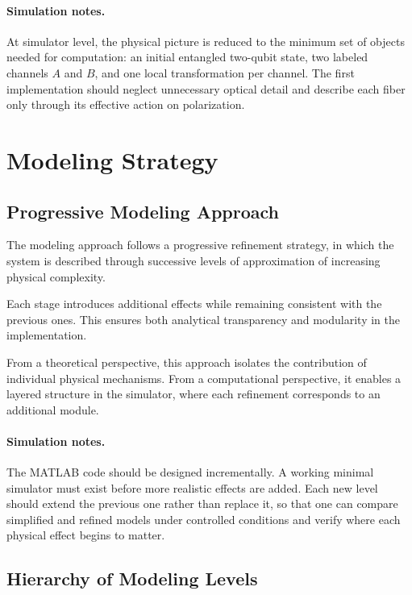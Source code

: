 \documentclass[a4paper]{article}
\begin{document}
\paragraph{Simulation notes.}
At simulator level, the physical picture is reduced to the minimum set of objects needed for computation: an initial entangled two-qubit state, two labeled channels \(A\) and \(B\), and one local transformation per channel. The first implementation should neglect unnecessary optical detail and describe each fiber only through its effective action on polarization.

\section{Modeling Strategy}

\subsection{Progressive Modeling Approach}

The modeling approach follows a progressive refinement strategy, in which the system is described through successive levels of approximation of increasing physical complexity.

Each stage introduces additional effects while remaining consistent with the previous ones. This ensures both analytical transparency and modularity in the implementation.

From a theoretical perspective, this approach isolates the contribution of individual physical mechanisms. From a computational perspective, it enables a layered structure in the simulator, where each refinement corresponds to an additional module.

\paragraph{Simulation notes.}
The MATLAB code should be designed incrementally. A working minimal simulator must exist before more realistic effects are added. Each new level should extend the previous one rather than replace it, so that one can compare simplified and refined models under controlled conditions and verify where each physical effect begins to matter.

\subsection{Hierarchy of Modeling Levels}
\end{document}
